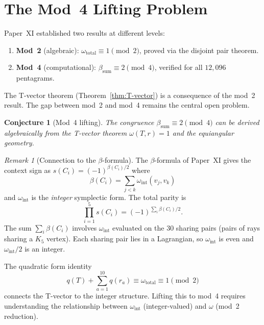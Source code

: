 \documentclass[11pt,a4paper]{article}
\newtheorem{conjecture}[theorem]{Conjecture}
\theoremstyle{remark}
\newtheorem{remark}[theorem]{Remark}
\begin{document}
\section{The Mod~4 Lifting Problem}
\label{sec:mod4}

Paper~XI established two results at different levels:
\begin{enumerate}
  \item \textbf{Mod~2} (algebraic): $\omega_{\text{total}} \equiv 1
    \pmod{2}$, proved via the disjoint pair theorem.
  \item \textbf{Mod~4} (computational): $\beta_{\text{sum}} \equiv 2
    \pmod{4}$, verified for all $12{,}096$ pentagrams.
\end{enumerate}

The T-vector theorem (Theorem~\ref{thm:T-vector}) is a consequence of
the mod~2 result. The gap between mod~2 and mod~4 remains the central
open problem.

\begin{conjecture}[Mod~4 lifting]
\label{conj:mod4}
The congruence $\beta_{\text{sum}} \equiv 2 \pmod{4}$ can be derived
algebraically from the T-vector theorem $\omega(T, r) = 1$ and the
equiangular geometry.
\end{conjecture}

\begin{remark}[Connection to the $\beta$-formula]
\label{rem:beta-connection}
The $\beta$-formula of Paper~XI gives the context sign as
$s(C_i) = (-1)^{\beta(C_i)/2}$ where
\[
  \beta(C_i) = \sum_{j<k} \omega_{\text{int}}(v_j, v_k)
\]
and $\omega_{\text{int}}$ is the \emph{integer} symplectic form. The
total parity is
\[
  \prod_{i=1}^5 s(C_i) = (-1)^{\sum_i \beta(C_i)/2}.
\]
The sum $\sum_i \beta(C_i)$ involves $\omega_{\text{int}}$ evaluated on
the 30 sharing pairs (pairs of rays sharing a $K_5$ vertex). Each
sharing pair lies in a Lagrangian, so $\omega_{\text{int}}$ is even and
$\omega_{\text{int}}/2$ is an integer.

\medskip

The quadratic form identity
\[
  q(T) + \sum_{a=1}^{10} q(r_a) \equiv \omega_{\text{total}} \equiv 1
  \pmod{2}
\]
connects the T-vector to the integer structure. Lifting this to mod~4
requires understanding the relationship between $\omega_{\text{int}}$
(integer-valued) and $\omega$ (mod~2 reduction).
\end{remark}
\end{document}
